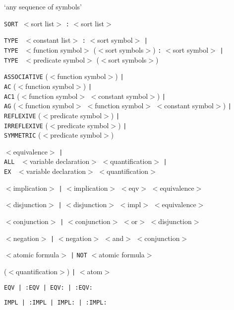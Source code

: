 %
{{\tt *} `any sequence of symbols'}

%
{{\tt SORT }$<$sort list$>$ {\tt :} $<$sort list$>$}

%
{{\tt TYPE } $<$constant  list$>$ {\tt :} $<$sort symbol$>$ {\tt |}\\
 {\tt TYPE } $<$function symbol$>$  ($<$sort symbols$>$) {\tt :} $<$sort symbol$>$ {\tt |}\\
{\tt TYPE } $<$predicate symbol$>$  ($<$sort symbols$>$)}

%
{{\tt ASSOCIATIVE} ($<$function symbol$>$) {\tt |}\\
{\tt AC} ($<$function symbol$>$) {\tt |}\\
{\tt AC1} ($<$function symbol$>$ $<$constant symbol$>$) {\tt |}\\
{\tt AG} ($<$function symbol$>$ $<$function symbol$>$
$<$constant symbol$>$) {\tt |}\\
{\tt REFLEXIVE} ($<$predicate symbol$>$)  {\tt |}\\
{\tt IRREFLEXIVE} ($<$predicate symbol$>$) {\tt |}\\
{\tt SYMMETRIC} ($<$predicate symbol$>$)}

%
{$<$equivalence$>$ {\tt |}\\
{\tt ALL } $<$variable declaration$>$ $<$quantification$>$ {\tt |}\\
{\tt EX } $<$variable declaration$>$ $<$quantification$>$}

%
{$<$implication$>$ {\tt |}
$<$implication$>$ $<$eqv$>$ $<$equivalence$>$}

%
{$<$disjunction$>$  {\tt |}
$<$disjunction$>$  $<$impl$>$ $<$equivalence$>$} 

%
{$<$conjunction$>$  {\tt |}
$<$conjunction$>$ $<$or$>$ $<$disjunction$>$}

%
{$<$negation$>$  {\tt |}
$<$negation$>$ $<$and$>$ $<$conjunction$>$}

%
{$<$atomic formula$>$  {\tt |}
{\tt NOT} $<$atomic formula$>$}

%
{ ($<$quantification$>$) {\tt |} $<$atom$>$}

%
{{\tt EQV  {\tt |}  :EQV  {\tt |}  EQV:  {\tt |}  :EQV: }}

%
{{\tt IMPL  {\tt |}  :IMPL  {\tt |}  IMPL:  {\tt |}  :IMPL: }}


